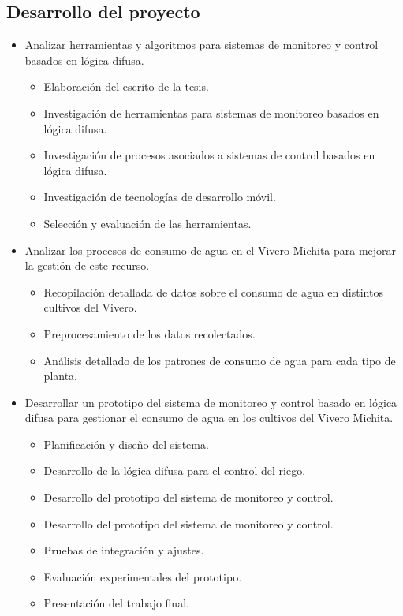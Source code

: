 \subsection{Desarrollo del proyecto}
\begin{itemize}
    \item Analizar herramientas y algoritmos para sistemas de monitoreo y control basados en lógica difusa.
          \begin{itemize}
              \item Elaboración del escrito de la tesis.
              \item Investigación de herramientas
              para sistemas de monitoreo
              basados en lógica difusa.
              \item Investigación de procesos
              asociados a sistemas de control
              basados en lógica difusa.
              \item Investigación de tecnologías de
              desarrollo móvil.
              \item Selección y evaluación de las
              herramientas.
          \end{itemize}
    \item Analizar los procesos de
    consumo de agua en el
    Vivero Michita para
    mejorar la gestión de este
    recurso.
          \begin{itemize}
              \item Recopilación detallada de datos
              sobre el consumo de agua en
              distintos cultivos del Vivero.
              \item Preprocesamiento de los datos
              recolectados.
              \item Análisis detallado de los
              patrones de consumo de agua
              para cada tipo de planta.
          \end{itemize}
    \item Desarrollar un prototipo del
    sistema de monitoreo y
    control basado en lógica
    difusa para gestionar el
    consumo de agua en los
    cultivos del Vivero Michita.
          \begin{itemize}
              \item Planificación y diseño del
              sistema.
              \item Desarrollo de la lógica difusa
              para el control del riego.
              \item Desarrollo del prototipo del
              sistema de monitoreo y control.
              \item Desarrollo del prototipo del
              sistema de monitoreo y control.
              \item Pruebas de integración y ajustes.
              \item Evaluación experimentales del
              prototipo.
              \item Presentación del trabajo final.
          \end{itemize}
\end{itemize}